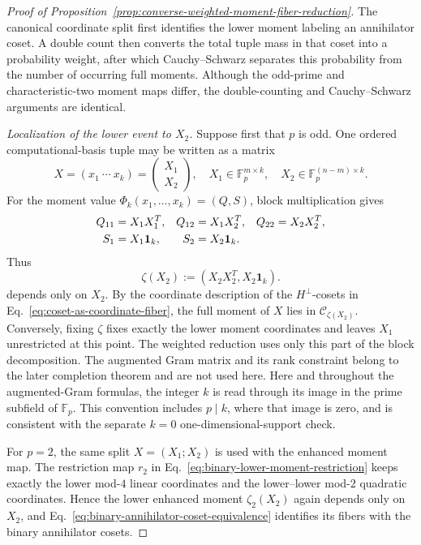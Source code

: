 \documentclass[11pt]{article}
\newcommand{\F}{\mathbb F}
\newcommand{\1}{\mathbf 1}
\theoremstyle{plain}
\theoremstyle{definition}
\theoremstyle{remark}
\begin{document}
\begin{proof}[Proof of Proposition~\ref{prop:converse-weighted-moment-fiber-reduction}]
The canonical coordinate split first identifies the lower moment labeling an annihilator coset.  A double count then converts the total tuple mass in that coset into a probability weight, after which Cauchy--Schwarz separates this probability from the number of occurring full moments.  Although the odd-prime and characteristic-two moment maps differ, the double-counting and Cauchy--Schwarz arguments are identical.

\smallskip
\noindent\emph{Localization of the lower event to $X_2$.}
Suppose first that $p$ is odd.  One ordered computational-basis tuple may be
written as a matrix
\begin{equation}
 X=(x_1\ \cdots\ x_k)
 =\begin{pmatrix}X_1\\X_2\end{pmatrix},
 \quad
 X_1\in\F_p^{m\times k},\quad
 X_2\in\F_p^{(n-m)\times k}.
 \label{eq:X-blocks}
\end{equation}
For the moment value $\Phi_k(x_1,\ldots,x_k)=(Q,S)$, block multiplication gives
\begin{align}
 Q_{11}&=X_1X_1^T,&
 Q_{12}&=X_1X_2^T,&
 Q_{22}&=X_2X_2^T,\notag\\
 S_1&=X_1\1_k,&
 S_2&=X_2\1_k.
 \label{eq:moment-blocks}
\end{align}
Thus
\begin{equation}
 \zeta(X_2):=(X_2X_2^T,X_2\1_k).
 \label{eq:zeta-of-X2}
\end{equation}
depends only on $X_2$.  By the coordinate description of the
$H^\perp$-cosets in Eq.~\eqref{eq:coset-as-coordinate-fiber}, the full moment
of $X$ lies in $\mathcal C_{\zeta(X_2)}$.  Conversely, fixing $\zeta$ fixes
exactly the lower moment coordinates and leaves $X_1$ unrestricted at this
point.  The weighted reduction uses only this part of the block decomposition.  The augmented Gram matrix and its rank constraint belong to
the later completion theorem and are not used here.
Here and throughout the augmented-Gram formulas, the integer $k$ is read through its image in the prime subfield of $\F_p$.  This convention includes $p\mid k$, where that image is zero, and is consistent with the separate $k=0$ one-dimensional-support check.

For $p=2$, the same split $X=(X_1;X_2)$ is used with the enhanced moment map.
The restriction map $r_2$ in Eq.~\eqref{eq:binary-lower-moment-restriction}
keeps exactly the lower mod-$4$ linear coordinates and the lower--lower
mod-$2$ quadratic coordinates.  Hence the lower enhanced moment
$\zeta_2(X_2)$ again depends only on $X_2$, and
Eq.~\eqref{eq:binary-annihilator-coset-equivalence} identifies its fibers with
the binary annihilator cosets.


\end{proof}
\end{document}
